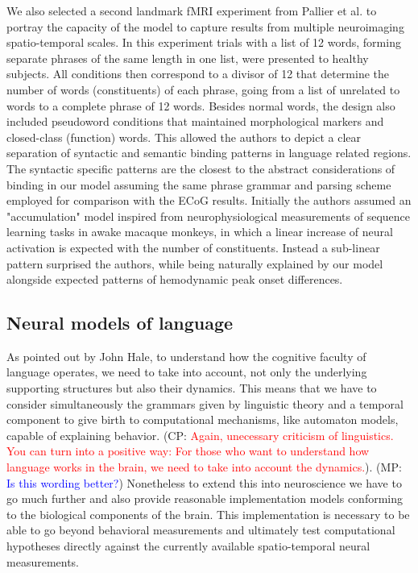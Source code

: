 \documentclass[10pt]{article}
\newcommand{\noteCP}[1]{(CP: \textcolor{red}{#1})}
\newcommand{\noteMP}[2]{(MP: \textcolor{blue}{#1})}
\begin{document}
We also selected a second landmark fMRI experiment from Pallier et al.\cite{Pallier_2011} to portray the capacity of the model to capture results from multiple neuroimaging spatio-temporal scales.
In this experiment trials with a list of 12 words, forming separate phrases of the same length in one list, were presented to healthy subjects.
All conditions then correspond to a divisor of 12 that determine the number of words (constituents) of each phrase, going from a list of unrelated to words to a complete phrase of 12 words.
Besides normal words, the design also included pseudoword conditions that maintained morphological markers and closed-class (function) words.
This allowed the authors to depict a clear separation of syntactic and semantic binding patterns in language related regions.
The syntactic specific patterns are the closest to the abstract considerations of binding in our model assuming the same phrase grammar and parsing scheme employed for comparison with the ECoG results.
Initially the authors assumed an "accumulation" model inspired from neurophysiological measurements of sequence learning tasks in awake macaque monkeys, in which a linear increase of neural activation is expected with the number of constituents.
Instead a sub-linear pattern surprised the authors, while being naturally explained by our model alongside expected patterns of hemodynamic peak onset differences.


\subsection{Neural models of language}

{\label{619233}}

As pointed out by John Hale\cite{hale2014automaton}, to understand how the cognitive faculty of language operates, we need to take into account, not only the underlying supporting structures but also their dynamics. This means that we have to consider simultaneously the grammars given by linguistic theory and a temporal component to give birth to computational mechanisms, like automaton models, capable of explaining behavior.
\noteCP{Again, unecessary criticism of linguistics. You can turn into a positive way: For those who want to understand how language works in the brain, we need to take into account the dynamics.}.
\noteMP{Is this wording better?}.
Nonetheless to extend this into neuroscience we have to go much further and also provide reasonable implementation models conforming to the biological components of the brain.
This implementation is necessary to be able to go beyond behavioral measurements and ultimately test computational hypotheses directly against the currently available spatio-temporal neural measurements.
\end{document}
